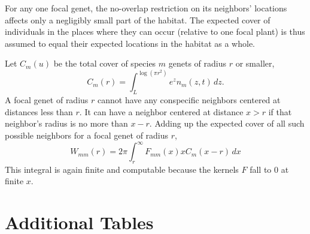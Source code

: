 \documentclass[11pt]{article}
\begin{document}
For any one focal genet, the no-overlap restriction on its neighbors' locations affects 
only a negligibly small part of the habitat. The expected cover of individuals in the places
where they can occur (relative to one focal plant) is thus assumed to equal their expected locations
in the habitat as a whole. 
 
Let $C_m(u)$ be the total cover of species $m$ genets of radius $r$ or smaller, 
\begin{equation}
C_m(r) = \int_L^{\log(\pi r^2)}{\! \! \! e^z n_m(z,t) \, dz} .
\label{eqn:cm}
\end{equation}
A focal genet of radius $r$ cannot have any conspecific neighbors centered 
at distances less than $r$. It can have a neighbor centered at distance $x>r$ if that neighbor's
radius is no more than $x-r$. Adding up the expected cover of all such possible neighbors
for a focal genet of radius $r$,    
\begin{equation}
W_{mm}(r) = 2 \pi \int_r^{\infty}F_{mm}(x) x C_m(x-r) \, dx
\label{eqn:wbarmr} 
\end{equation}
This integral is again finite and computable because the kernels $F$ fall to 0 at finite $x$. 

\clearpage 
\newpage  
\section{Additional Tables} 

\end{document}
